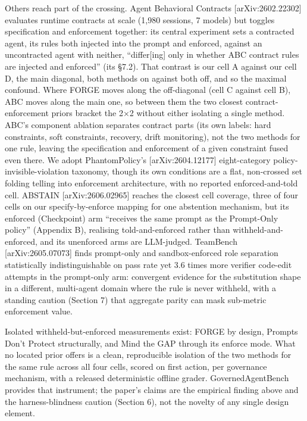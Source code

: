 \documentclass[
]{article}
\begin{document}
Others reach part of the crossing. Agent Behavioral Contracts
{[}arXiv:2602.22302{]} evaluates runtime contracts at scale (1,980
sessions, 7 models) but toggles specification and enforcement together:
its central experiment sets a contracted agent, its rules both injected
into the prompt and enforced, against an uncontracted agent with
neither, ``differ{[}ing{]} only in whether ABC contract rules are
injected and enforced'' (its §7.2). That contrast is our cell A against
our cell D, the main diagonal, both methods on against both off, and so
the maximal confound. Where FORGE moves along the off-diagonal (cell C
against cell B), ABC moves along the main one, so between them the two
closest contract-enforcement priors bracket the 2×2 without either
isolating a single method. ABC's component ablation separates contract
parts (its own labels: hard constraints, soft constraints, recovery,
drift monitoring), not the two methods for one rule, leaving the
specification and enforcement of a given constraint fused even there. We
adopt PhantomPolicy's {[}arXiv:2604.12177{]} eight-category
policy-invisible-violation taxonomy, though its own conditions are a
flat, non-crossed set folding telling into enforcement architecture,
with no reported enforced-and-told cell. ABSTAIN {[}arXiv:2606.02965{]}
reaches the closest cell coverage, three of four cells on our
specify-by-enforce mapping for one abstention mechanism, but its
enforced (Checkpoint) arm ``receives the same prompt as the Prompt-Only
policy'' (Appendix B), realising told-and-enforced rather than
withheld-and-enforced, and its unenforced arms are LLM-judged. TeamBench
{[}arXiv:2605.07073{]} finds prompt-only and sandbox-enforced role
separation statistically indistinguishable on pass rate yet 3.6 times
more verifier code-edit attempts in the prompt-only arm: convergent
evidence for the substitution shape in a different, multi-agent domain
where the rule is never withheld, with a standing caution (Section 7)
that aggregate parity can mask sub-metric enforcement value.

Isolated withheld-but-enforced measurements exist: FORGE by design,
Prompts Don't Protect structurally, and Mind the GAP through its enforce
mode. What no located prior offers is a clean, reproducible isolation of
the two methods for the same rule across all four cells, scored on first
action, per governance mechanism, with a released deterministic offline
grader. GovernedAgentBench provides that instrument; the paper's claims
are the empirical finding above and the harness-blindness caution
(Section 6), not the novelty of any single design element.
\end{document}
